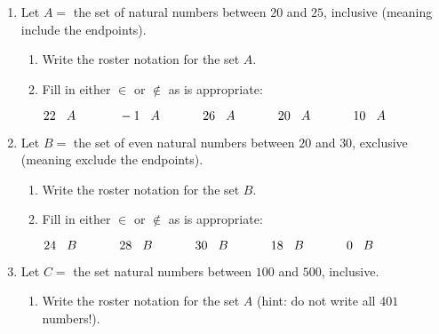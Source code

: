 \documentclass[letterpaper,12pt,fleqn]{article}
\begin{document}
\begin{enumerate}
\item Let $A=$ the set of natural numbers between $20$ and $25$, inclusive
  (meaning include the endpoints).
  \begin{enumerate}
  \item Write the roster notation for the set $A$.

    \vspace{0.5in}
    
  \item Fill in either $\in$ or $\notin$ as is appropriate:
    
    $22\hspace{2ex}A\hspace{8ex}-1\hspace{2ex}A\hspace{8ex}26\hspace{2ex}A
    \hspace{8ex}20\hspace{2ex}A\hspace{8ex}10\hspace{2ex}A$
  \end{enumerate}

  \newpage

\item Let $B=$ the set of even natural numbers between $20$ and $30$, exclusive
  (meaning exclude the endpoints).
  \begin{enumerate}
  \item Write the roster notation for the set $B$.

    \vspace{0.5in}
    
  \item Fill in either $\in$ or $\notin$ as is appropriate:
    
    $24\hspace{2ex}B\hspace{8ex}28\hspace{2ex}B\hspace{8ex}30\hspace{2ex}B
    \hspace{8ex}18\hspace{2ex}B\hspace{8ex}0\hspace{2ex}B$
  \end{enumerate}

  \bigskip

\item Let $C=$ the set natural numbers between $100$ and $500$, inclusive.
  \begin{enumerate}
  \item Write the roster notation for the set $A$ (hint: do not write all
    $401$ numbers!).


\end{enumerate}
\end{enumerate}
\end{document}
